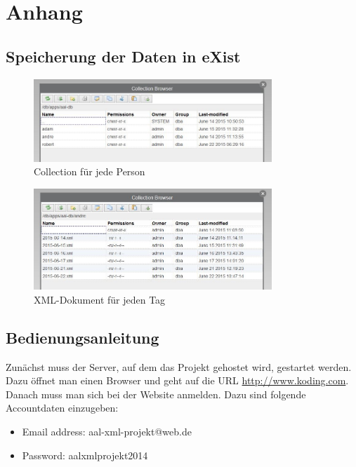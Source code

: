 \appendix

\section{Anhang}
\subsection{Speicherung der Daten in eXist}
\begin{figure}[H]
	\centering
		\includegraphics[width=0.8\textwidth]{images/collections1.jpg}
		\caption{Collection für jede Person} 
		\label{collection1}
	\centering
\end{figure}
\begin{figure}[H]
	\centering
		\includegraphics[width=0.8\textwidth]{images/collections2.jpg}
		\caption{XML-Dokument für jeden Tag} 
		\label{collection2}
	\centering
\end{figure}

\subsection{Bedienungsanleitung}
Zunächst muss der Server, auf dem das Projekt gehostet wird, gestartet werden. Dazu öffnet man einen Browser und geht auf die URL \url{http://www.koding.com}. Danach muss man sich bei der Website anmelden. Dazu sind folgende Accountdaten einzugeben:

\begin{itemize}
	\item Email address: aal-xml-projekt@web.de
	\item Password: aalxmlprojekt2014
\end{itemize}

